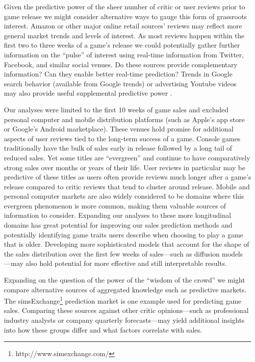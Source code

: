 \documentclass[letterpaper]{article}
\begin{document}
Given the predictive power of the sheer number of critic or user reviews prior to game release we might consider alternative ways to gauge this form of grassroots interest. Amazon or other major online retail sources' reviews may reflect more general market trends and levels of interest. As most reviews happen within the first two to three weeks of a game's release we could potentially gather further information on the ``pulse'' of interest using real-time information from Twitter, Facebook, and similar social venues. Do these sources provide complementary information? Can they enable better real-time prediction? Trends in Google search behavior (available from Google trends) or advertising Youtube videos may also provide useful supplemental predictive power \cite{asur2010predicting}.

Our analyses were limited to the first 10 weeks of game sales and excluded personal computer and mobile distribution platforms (such as Apple's app store or Google's Android marketplace). These venues hold promise for additional aspects of user reviews tied to the long-term success of a game. Console games traditionally have the bulk of sales early in release followed by a long tail of reduced sales. Yet some titles are ``evergreen'' and continue to have comparatively strong sales over months or years of their life. User reviews in particular may be predictive of these titles as users often provide reviews much longer after a game's release compared to critic reviews that tend to cluster around release. Mobile and personal computer markets are also widely considered to be domains where this evergreen phenomenon is more common, making them valuable sources of information to consider. Expanding our analyses to these more longitudinal domains has great potential for improving our sales prediction methods and potentially identifying game traits users describe when choosing to play a game that is older. Developing more sophisticated models that account for the shape of the sales distribution over the first few weeks of sales---such as diffusion models \cite{dellarocas2007exploring}---may also hold potential for more effective and still interpretable results.

Expanding on the question of the power of the ``wisdom of the crowd'' we might compare alternative sources of aggregated knowledge such as predictive markets. The simsExchange\footnote{http://www.simexchange.com/} prediction market is one example used for predicting game sales. Comparing these sources against other critic opinions---such as professional industry analysts or company quarterly forecasts---may yield additional insights into how these groups differ and what factors correlate with sales.
\end{document}
